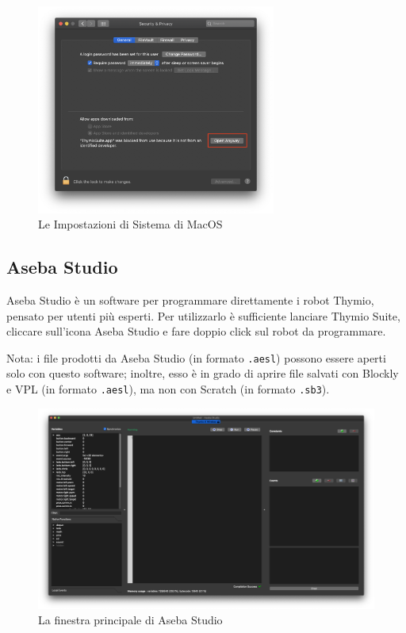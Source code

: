 \documentclass[12pt]{article}
\begin{document}
	\begin{figure}[H]
		\centering
			\includegraphics[width=0.7\textwidth]{img/macWarn.png}
			\caption{Le Impostazioni di Sistema di MacOS}
			\label{macErr}
	\end{figure}
	
	\newpage
		
	\subsection{Aseba Studio}
	
		Aseba Studio è un software per programmare direttamente i robot Thymio, pensato per utenti più esperti. Per utilizzarlo è sufficiente lanciare Thymio Suite, cliccare sull'icona Aseba Studio e fare doppio click sul robot da programmare.
		
		Nota: i file prodotti da Aseba Studio (in formato \texttt{.aesl}) possono essere aperti solo con questo software; inoltre, esso è in grado di aprire file salvati con Blockly e VPL (in formato \texttt{.aesl}), ma non con Scratch (in formato \texttt{.sb3}).
		
		\begin{figure}[H]
			\includegraphics[width=\textwidth]{img/asebaStudio.png}
			\caption{La finestra principale di Aseba Studio}
			\label{main_aseba}
		\end{figure}		
		
\end{document}
